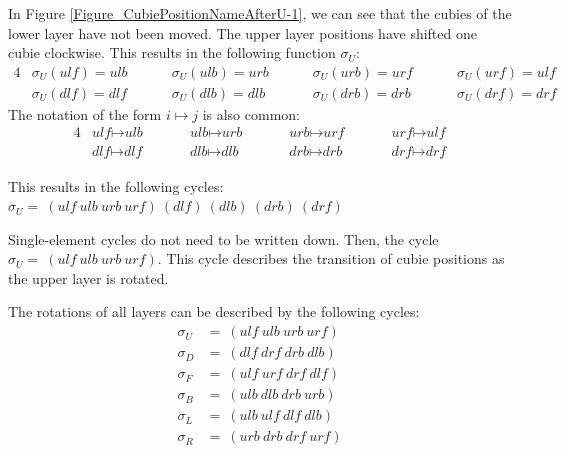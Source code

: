 \documentclass[12pt,a4paper]{article}
\theoremstyle{custom}
\begin{document}
In Figure \ref{Figure_CubiePositionNameAfterU-1}, we can see that the cubies of the lower layer have not been moved. The upper layer positions have shifted one cubie clockwise. This results in the following function $\sigma_U$:
\begin{alignat*}{4}
& \sigma_U(\textit{ulf})=\textit{ulb} \ \ \ \ \ \ \ && \sigma_U(\textit{ulb})=\textit{urb} \ \ \ \ \ \ \ && \sigma_U(\textit{urb})=\textit{urf} \ \ \ \ \ \ \ && \sigma_U(\textit{urf})=\textit{ulf} \\
& \sigma_U(\textit{dlf})=\textit{dlf} \ \ \ \ \ \ \ && \sigma_U(\textit{dlb})=\textit{dlb} \ \ \ \ \ \ \ && \sigma_U(\textit{drb})=\textit{drb} \ \ \ \ \ \ \ && \sigma_U(\textit{drf})=\textit{drf} 
\end{alignat*}
The notation of the form $i \mapsto j$ is also common:
\begin{alignat*}{4}
& \textit{ulf} \mapsto \textit{ulb} \ \ \ \ \ \ \ \ && \textit{ulb} \mapsto \textit{urb} \ \ \ \ \ \ \ \ && \textit{urb} \mapsto \textit{urf} \ \ \ \ \ \ \ \ && \textit{urf} \mapsto \textit{ulf} \\
& \textit{dlf} \mapsto \textit{dlf} \ \ \ \ \ \ \ \ && \textit{dlb} \mapsto \textit{dlb} \ \ \ \ \ \ \ \ \ && \textit{drb} \mapsto \textit{drb} \ \ \ \ \ \ \ \ && \textit{drf} \mapsto \textit{drf} 
\end{alignat*}

This results in the following cycles: $\sigma_U = \ ( \textit{ulf} \ \textit{ulb} \ \textit{urb} \ \textit{urf} )\ ( \textit{dlf} )\ ( \textit{dlb} )\ ( \textit{drb} )\ ( \textit{drf} )$

Single-element cycles do not need to be written down. Then, the cycle $\sigma_U = \ ( \textit{ulf} \ \textit{ulb} \ \textit{urb} \ \textit{urf} )$. This cycle describes the transition of cubie positions as the upper layer is rotated.


The rotations of all layers can be described by the following cycles:
\begin{align*}
\sigma_U & =\ ( \textit{ulf} \ \textit{ulb} \ \textit{urb} \ \textit{urf} ) \\
\sigma_D & =\ ( \textit{dlf} \ \textit{drf} \ \textit{drb} \ \textit{dlb} ) \\
\sigma_F & =\ ( \textit{ulf} \ \textit{urf} \ \textit{drf} \ \textit{dlf} ) \\
\sigma_B & =\ ( \textit{ulb} \ \textit{dlb} \ \textit{drb} \ \textit{urb} ) \\
\sigma_L & =\ ( \textit{ulb} \ \textit{ulf} \ \textit{dlf} \ \textit{dlb} ) \\
\sigma_R & =\ ( \textit{urb} \ \textit{drb} \ \textit{drf} \ \textit{urf} ) 
\end{align*}
\end{document}
